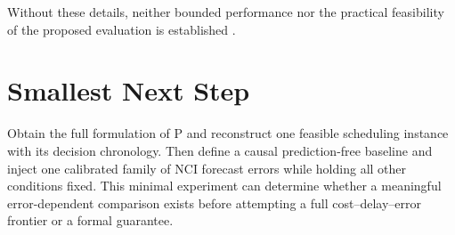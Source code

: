 \documentclass{article}
\begin{document}
Without these details, neither bounded performance nor the practical feasibility of the proposed evaluation is established .

\section{Smallest Next Step}

Obtain the full formulation of P and reconstruct one feasible scheduling instance with its decision chronology. Then define a causal prediction-free baseline and inject one calibrated family of NCI forecast errors while holding all other conditions fixed. This minimal experiment can determine whether a meaningful error-dependent comparison exists before attempting a full cost--delay--error frontier or a formal guarantee.
\end{document}
